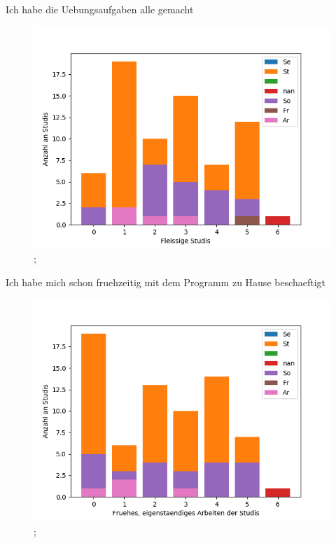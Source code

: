 \documentclass[10pt]{beamer}
\begin{document}
\begin{frame}[fragile]{Ich habe die Uebungsaufgaben alle gemacht} 
 \begin{figure}
 \includegraphics[width= 0.9\linewidth]{./PDFcreater/Plots/SolidEdge/Ich+habe+die+Uebungsaufgaben+alle+gemacht.png};
 \end{figure}
 \end{frame}
\begin{frame}[fragile]{Ich habe mich schon fruehzeitig mit dem Programm zu Hause beschaeftigt} 
 \begin{figure}
 \includegraphics[width= 0.9\linewidth]{./PDFcreater/Plots/SolidEdge/Ich+habe+mich+schon+fruehzeitig+mit+dem+Programm+zu+Hause+beschaeftigt.png};
 \end{figure}
 \end{frame}
\end{document}
